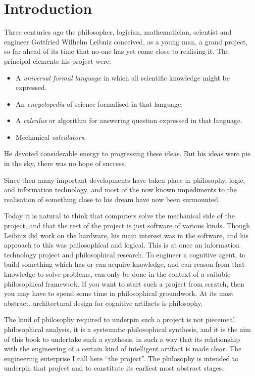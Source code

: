 \chapter{Introduction}\label{Introduction}

Three centuries ago the philosopher, logician, mathematician,
scientist and engineer Gottfried Wilhelm Leibniz conceived, as a young
man, a grand project, so far ahead of its time that no-one has yet
come close to realising it.
The principal elements his project were:
\begin{itemize}
\item A \emph{universal formal language} in which all scientific
  knowledge might be expressed.
\item An \emph{encyclopedia} of science formalised in that language.
\item A \emph{calculus} or algorithm for answering question expressed
  in that language.
\item Mechanical \emph{calculators}.
\end{itemize}

He devoted considerable energy to progressing these ideas.
But his ideas were pie in the sky, there was no hope of success.

Since then many important developments have taken place in philosophy,
logic, and information technology, and most of the now known
impediments to the realisation of something close to his dream have
now been surmounted.

Today it is natural to think that computers solve the mechanical side
of the project, and that the rest of the project is just software of
various kinds.
Though Leibniz did work on the hardware, his main interest was in the
software, and his approach to this was philosophical and logical.
This is at once an information technology project and philosophical research.
To engineer a cognitive agent, to build something which has or can
acquire knowledge, and can reason from that knowledge to solve
problems, can only be done in the context of a suitable philosophical
framework.
If you want to start such a project from scratch, then you may have to
spend some time in philosophical groundwork.
At its most abstract, architectural design for cognitive artifacts is philosophy.

The kind of philosophy required to underpin such a project is not
piecemeal philosophical analysis, it is a systematic philosophical
synthesis, and it is the aim of this book to undertake such a
synthesis, in such a way that its relationship with the engineering of
a certain kind of intelligent artifact is made clear.
The engineering enterprise I call here ``the project''.
The philosophy is intended to underpin that project and to constitute
its earliest most abstract stages.


